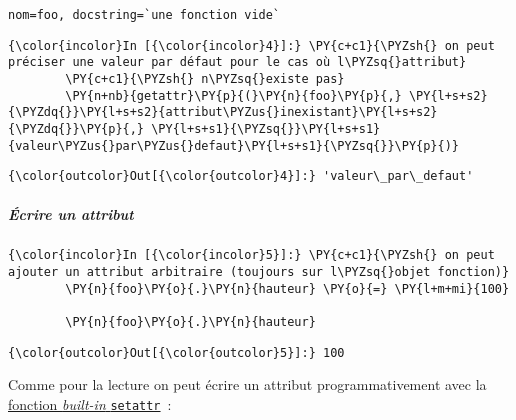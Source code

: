     \begin{Verbatim}[commandchars=\\\{\},frame=single,framerule=0.3mm,rulecolor=\color{cellframecolor}]
nom=foo, docstring=`une fonction vide`
\end{Verbatim}

    \begin{Verbatim}[commandchars=\\\{\},frame=single,framerule=0.3mm,rulecolor=\color{cellframecolor}]
{\color{incolor}In [{\color{incolor}4}]:} \PY{c+c1}{\PYZsh{} on peut préciser une valeur par défaut pour le cas où l\PYZsq{}attribut}
        \PY{c+c1}{\PYZsh{} n\PYZsq{}existe pas}
        \PY{n+nb}{getattr}\PY{p}{(}\PY{n}{foo}\PY{p}{,} \PY{l+s+s2}{\PYZdq{}}\PY{l+s+s2}{attribut\PYZus{}inexistant}\PY{l+s+s2}{\PYZdq{}}\PY{p}{,} \PY{l+s+s1}{\PYZsq{}}\PY{l+s+s1}{valeur\PYZus{}par\PYZus{}defaut}\PY{l+s+s1}{\PYZsq{}}\PY{p}{)}
\end{Verbatim}


\begin{Verbatim}[commandchars=\\\{\},frame=single,framerule=0.3mm,rulecolor=\color{cellframecolor}]
{\color{outcolor}Out[{\color{outcolor}4}]:} 'valeur\_par\_defaut'
\end{Verbatim}
            
    \hypertarget{uxe9crire-un-attribut}{%
\subparagraph{Écrire un attribut}\label{uxe9crire-un-attribut}}

    \begin{Verbatim}[commandchars=\\\{\},frame=single,framerule=0.3mm,rulecolor=\color{cellframecolor}]
{\color{incolor}In [{\color{incolor}5}]:} \PY{c+c1}{\PYZsh{} on peut ajouter un attribut arbitraire (toujours sur l\PYZsq{}objet fonction)}
        \PY{n}{foo}\PY{o}{.}\PY{n}{hauteur} \PY{o}{=} \PY{l+m+mi}{100}
        
        \PY{n}{foo}\PY{o}{.}\PY{n}{hauteur}
\end{Verbatim}


\begin{Verbatim}[commandchars=\\\{\},frame=single,framerule=0.3mm,rulecolor=\color{cellframecolor}]
{\color{outcolor}Out[{\color{outcolor}5}]:} 100
\end{Verbatim}
            
    Comme pour la lecture on peut écrire un attribut programmativement avec
la
\href{https://docs.python.org/3/library/functions.html\#setattr}{fonction
\emph{built-in} \texttt{setattr}}~:

